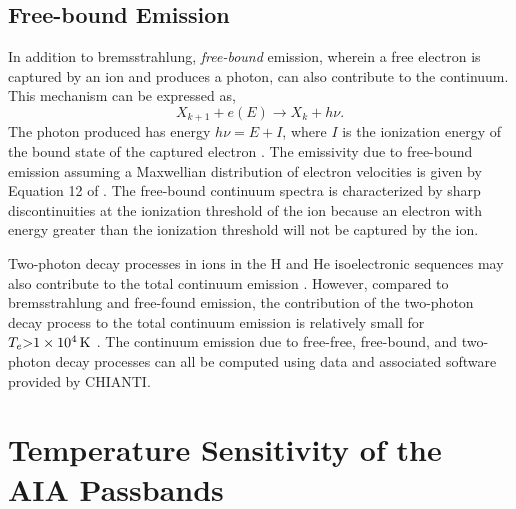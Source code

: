 \subsection{Free-bound Emission}

In addition to bremsstrahlung, \textit{free-bound} emission, wherein a free electron is captured by an ion and produces a photon, can also contribute to the continuum. This mechanism can be expressed as,
\begin{equation}\label{eq:free_bound_process}
    X_{k+1} + e(E) \to X_{k} + h\nu.
\end{equation}
The photon produced has energy $h\nu=E+I$, where $I$ is the ionization energy of the bound state of the captured electron \citep{del_zanna_solar_2018}. The emissivity due to free-bound emission assuming a Maxwellian distribution of electron velocities is given by Equation 12 of \citet{young_chianti-atomic_2003}. The free-bound continuum spectra is characterized by sharp discontinuities at the ionization threshold of the ion because an electron with energy greater than the ionization threshold will not be captured by the ion. 

Two-photon decay processes in ions in the H and He isoelectronic sequences may also contribute to the total continuum emission \citep{young_chianti-atomic_2003}. However, compared to bremsstrahlung and free-found emission, the contribution of the two-photon decay process to the total continuum emission is relatively small for $T_e\SI{> 1e4}{\kelvin}$ \citep{del_zanna_solar_2018}. The continuum emission due to free-free, free-bound, and two-photon decay processes can all be computed using data and associated software provided by CHIANTI.

\section{Temperature Sensitivity of the AIA Passbands}\label{sec:aia_response}

